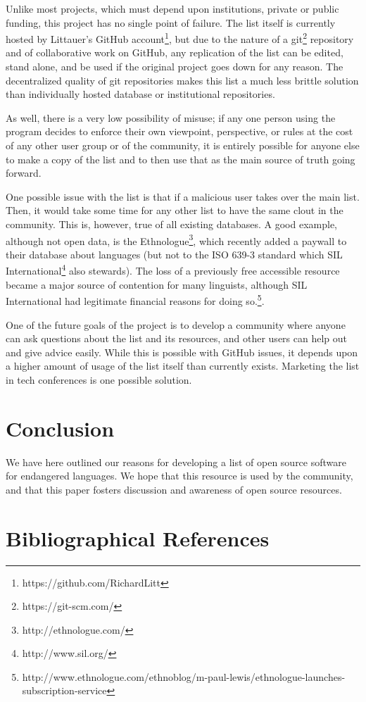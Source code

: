 \documentclass[10pt, a4paper]{article}
\begin{document}
Unlike most projects, which must depend upon institutions, private or public funding, this project has no single point of failure. The list itself is currently hosted by Littauer's GitHub account\footnote{https://github.com/RichardLitt}, but due to the nature of a git\footnote{https://git-scm.com/} repository and of collaborative work on GitHub, any replication of the list can be edited, stand alone, and be used if the original project goes down for any reason. The decentralized quality of git repositories makes this list a much less brittle solution than individually hosted database or institutional repositories. 

As well, there is a very low possibility of misuse; if any one person using the program decides to enforce their own viewpoint, perspective, or rules at the cost of any other user group or of the community, it is entirely possible for anyone else to make a copy of the list and to then use that as the main source of truth going forward. 

One possible issue with the list is that if a malicious user takes over the main list. Then, it would take some time for any other list to have the same clout in the community. This is, however, true of all existing databases. A good example, although not open data, is the Ethnologue\footnote{http://ethnologue.com/}, which recently added a paywall to their database about languages (but not to the ISO 639-3 standard which SIL International\footnote{http://www.sil.org/} also stewards). The loss of a previously free accessible resource became a major source of contention for many linguists, although SIL International had legitimate financial reasons for doing so.\footnote{http://www.ethnologue.com/ethnoblog/m-paul-lewis/ethnologue-launches-subscription-service}. 

One of the future goals of the project is to develop a community where anyone can ask questions about the list and its resources, and other users can help out and give advice easily. While this is possible with GitHub issues, it depends upon a higher amount of usage of the list itself than currently exists. Marketing the list in tech conferences is one possible solution. 

\section{Conclusion}

We have here outlined our reasons for developing a list of open source software for endangered languages. We hope that this resource is used by the community, and that this paper fosters discussion and awareness of open source resources. 

\section{Bibliographical References}
\label{main:ref}





\end{document}
